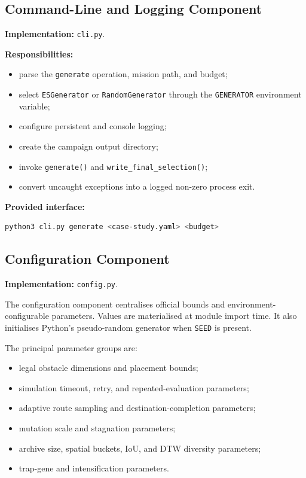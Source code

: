 \documentclass[11pt,a4paper]{report}
\newcommand{\code}[1]{\texttt{#1}}
\begin{document}
\subsection{Command-Line and Logging Component}
\textbf{Implementation:} \code{cli.py}.

\textbf{Responsibilities:}
\begin{itemize}
  \item parse the \code{generate} operation, mission path, and budget;
  \item select \code{ESGenerator} or \code{RandomGenerator} through the \code{GENERATOR} environment variable;
  \item configure persistent and console logging;
  \item create the campaign output directory;
  \item invoke \code{generate()} and \code{write\_final\_selection()};
  \item convert uncaught exceptions into a logged non-zero process exit.
\end{itemize}

\textbf{Provided interface:}
\begin{lstlisting}[language=bash]
python3 cli.py generate <case-study.yaml> <budget>
\end{lstlisting}

\subsection{Configuration Component}
\textbf{Implementation:} \code{config.py}.

The configuration component centralises official bounds and environment-configurable parameters. Values are materialised at module import time. It also initialises Python's pseudo-random generator when \code{SEED} is present.

The principal parameter groups are:
\begin{itemize}
  \item legal obstacle dimensions and placement bounds;
  \item simulation timeout, retry, and repeated-evaluation parameters;
  \item adaptive route sampling and destination-completion parameters;
  \item mutation scale and stagnation parameters;
  \item archive size, spatial buckets, IoU, and DTW diversity parameters;
  \item trap-gene and intensification parameters.
\end{itemize}
\end{document}
